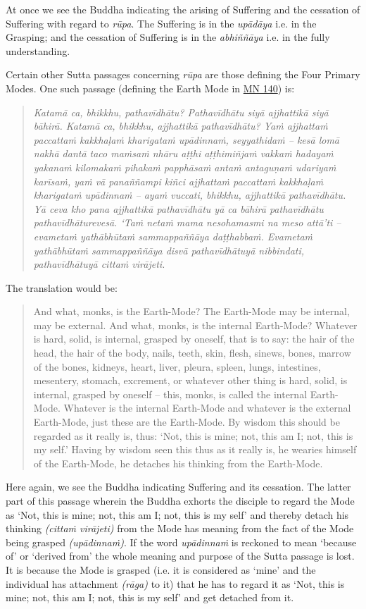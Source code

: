 At once we see the Buddha indicating the arising of Suffering and the cessation of Suffering with regard to \emph{rūpa}. The Suffering is in the \emph{upādāya} i.e. in the Grasping; and the cessation of Suffering is in the \emph{abhiññāya} i.e. in the fully understanding.

Certain other Sutta passages concerning \emph{rūpa} are those defining the Four Primary Modes. One such passage (defining the Earth Mode in \href{https://suttacentral.net/mn140/en/bodhi}{MN 140}) is:

\begin{quote}
\emph{Katamā ca, bhikkhu, pathavīdhātu? Pathavīdhātu siyā ajjhattikā siyā bāhirā. Katamā ca, bhikkhu, ajjhattikā pathavīdhātu? Yaṁ ajjhattaṁ paccattaṁ kakkhaḷaṁ kharigataṁ upādinnaṁ, seyyathidaṁ -- kesā lomā nakhā dantā taco maṁsaṁ nhāru aṭṭhi aṭṭhimiñjaṁ vakkaṁ hadayaṁ yakanaṁ kilomakaṁ pihakaṁ papphāsaṁ antaṁ antaguṇaṁ udariyaṁ karīsaṁ, yaṁ vā panaññampi kiñci ajjhattaṁ paccattaṁ kakkhaḷaṁ kharigataṁ upādinnaṁ -- ayaṁ vuccati, bhikkhu, ajjhattikā pathavīdhātu. Yā ceva kho pana ajjhattikā pathavīdhātu yā ca bāhirā pathavīdhātu pathavīdhāturevesā. `Taṁ netaṁ mama nesohamasmi na meso attā'ti -- evametaṁ yathābhūtaṁ sammappaññāya daṭṭhabbaṁ. Evametaṁ yathābhūtaṁ sammappaññāya disvā pathavīdhātuyā nibbindati, pathavīdhātuyā cittaṁ virājeti.}
\end{quote}

The translation would be:

\begin{quote}
And what, monks, is the Earth-Mode? The Earth-Mode may be internal, may be external. And what, monks, is the internal Earth-Mode? Whatever is hard, solid, is internal, grasped by oneself, that is to say: the hair of the head, the hair of the body, nails, teeth, skin, flesh, sinews, bones, marrow of the bones, kidneys, heart, liver, pleura, spleen, lungs, intestines, mesentery, stomach, excrement, or whatever other thing is hard, solid, is internal, grasped by oneself -- this, monks, is called the internal Earth-Mode. Whatever is the internal Earth-Mode and whatever is the external Earth-Mode, just these are the Earth-Mode. By wisdom this should be regarded as it really is, thus: `Not, this is mine; not, this am I; not, this is my self.' Having by wisdom seen this thus as it really is, he wearies himself of the Earth-Mode, he detaches his thinking from the Earth-Mode.
\end{quote}

Here again, we see the Buddha indicating Suffering and its cessation. The latter part of this passage wherein the Buddha exhorts the disciple to regard the Mode as `Not, this is mine; not, this am I; not, this is my self' and thereby detach his thinking \emph{(cittaṁ virājeti)} from the Mode has meaning  from the fact of the Mode being grasped \emph{(upādinnaṁ)}. If the word \emph{upādinnaṁ} is reckoned to mean `because of' or `derived from' the whole meaning and purpose of the Sutta passage is lost. It is because the Mode is grasped (i.e. it is considered as `mine' and the individual has attachment \emph{(rāga)} to it) that he has to regard it as `Not, this is mine; not, this am I; not, this is my self' and get detached from it.

